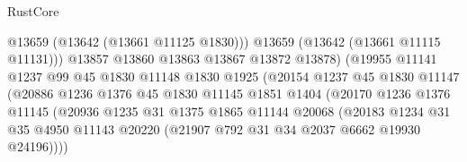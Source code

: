 \begin{lexlean}{RustCore}
\begin{coremodule}
                                            @13659
                                            (@13642 (@13661 @11125 @1830)))
                                          @13659
                                          (@13642 (@13661 @11115 @11131)))
                                        @13857
                                        @13860
                                        @13863
                                        @13867
                                        @13872
                                        @13878)
                                      (@19955
                                        @11141
                                        @1237
                                        @99
                                        @45
                                        @1830
                                        @11148
                                        @1830
                                        @1925
                                        (@20154
                                          @1237
                                          @45
                                          @1830
                                          @11147
                                          (@20886
                                            @1236
                                            @1376
                                            @45
                                            @1830
                                            @11145
                                            @1851
                                            @1404
                                            (@20170
                                              @1236
                                              @1376
                                              @11145
                                              (@20936
                                                @1235
                                                @31
                                                @1375
                                                @1865
                                                @11144
                                                @20068
                                                (@20183
                                                  @1234
                                                  @31
                                                  @35
                                                  @4950
                                                  @11143
                                                  @20220
                                                  (@21907 @792 @31 @34 @2037 @6662 @19930 @24196))))

\end{coremodule}
\end{lexlean}
